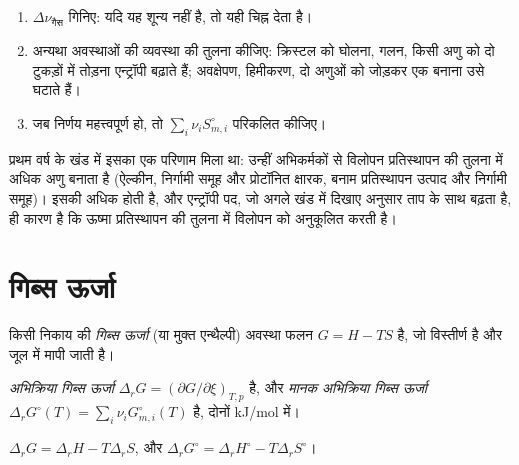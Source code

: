 \begin{method}\label{met:b2:reaction-free-energy:entropy-sign}
\begin{enumerate}
  \item $\Delta\nu_{\text{गैस}}$ गिनिए: यदि यह शून्य नहीं है, तो यही
        चिह्न देता है।
  \item अन्यथा अवस्थाओं की व्यवस्था की तुलना कीजिए: क्रिस्टल को घोलना,
        गलन, किसी अणु को दो टुकड़ों में तोड़ना एन्ट्रॉपी बढ़ाते हैं;
        अवक्षेपण, हिमीकरण, दो अणुओं को जोड़कर एक बनाना उसे घटाते हैं।
  \item जब निर्णय महत्त्वपूर्ण हो, तो $\sum_i\nu_iS^\circ_{m,i}$ परिकलित कीजिए।
\end{enumerate}
\end{method}

प्रथम वर्ष के खंड में इसका एक परिणाम मिला था: उन्हीं अभिकर्मकों से विलोपन
प्रतिस्थापन की तुलना में अधिक अणु बनाता है (ऐल्कीन, निर्गामी समूह
और प्रोटॉनित क्षारक, बनाम प्रतिस्थापन उत्पाद और निर्गामी
समूह)। इसकी  अधिक होती है, और एन्ट्रॉपी पद, जो
अगले खंड में दिखाए अनुसार ताप के साथ बढ़ता है, ही कारण है कि ऊष्मा
प्रतिस्थापन की तुलना में विलोपन को अनुकूलित करती है।

\section{गिब्स ऊर्जा}

\begin{definition}[गिब्स ऊर्जा]\label{def:b2:reaction-free-energy:gibbs-energy}
किसी निकाय की \emph{गिब्स ऊर्जा} (या मुक्त एन्थैल्पी)
अवस्था फलन $G = H - TS$ है, जो विस्तीर्ण है और जूल में मापी जाती है।
\end{definition}

\begin{definition}[अभिक्रिया गिब्स ऊर्जा]\label{def:b2:reaction-free-energy:reaction-gibbs}
\emph{अभिक्रिया गिब्स ऊर्जा} $\Delta_r G
= (\partial G/\partial\xi)_{T,p}$ है, और \emph{मानक अभिक्रिया गिब्स
ऊर्जा} $\Delta_r G^\circ(T) =
\sum_i\nu_iG^\circ_{m,i}(T)$ है, दोनों \unit{kJ/mol} में।
\end{definition}

\begin{proposition}[एन्थैल्पी पद और एन्ट्रॉपी पद]\label{prop:b2:reaction-free-energy:g-h-s}
$\Delta_r G = \Delta_r H - T\Delta_r S$, और $\Delta_r G^\circ = \Delta_r
H^\circ - T\Delta_r S^\circ$।
\end{proposition}

